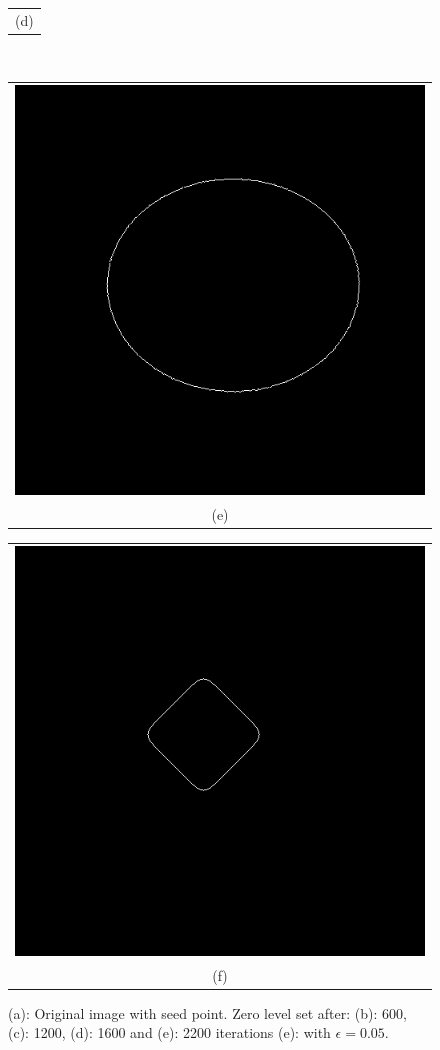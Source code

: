 \begin{figure}[h!]
\begin{minipage}{.49\textwidth}
\begin{tabular}{c}
(d)
\end{tabular}
\end{minipage}
\\
\begin{minipage}{.49\textwidth}
\begin{tabular}{c}
\includegraphics[width=.9\textwidth]{results/2D/circleZero2200_full} \\
(e)
\end{tabular}
\end{minipage}
\begin{minipage}{.49\textwidth}
\begin{tabular}{c}
\includegraphics[width=.9\textwidth]{results/2D/circleEps005} \\
(f)
\end{tabular}
\end{minipage}
\caption{(a): Original image with seed point. Zero level set after: (b): 600, (c): 1200, (d): 1600 and (e): 2200 iterations (e): with $\epsilon=0.05$.}
\label{circleZeroMany}
\end{figure}
